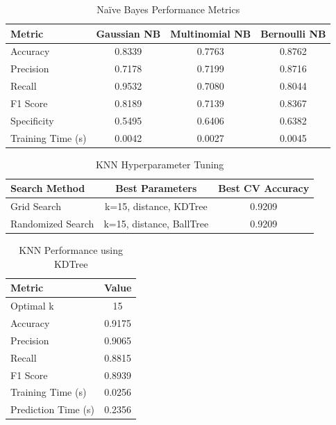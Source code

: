 \documentclass[11pt]{article}
\begin{document}
\begin{table}[H]
\centering
\caption{Naïve Bayes Performance Metrics}
\begin{tabular}{|l|c|c|c|}
\hline
\textbf{Metric} & \textbf{Gaussian NB} & \textbf{Multinomial NB} & \textbf{Bernoulli NB} \\ \hline
Accuracy & 0.8339 & 0.7763 & 0.8762 \\ \hline
Precision & 0.7178 & 0.7199 & 0.8716 \\ \hline
Recall & 0.9532 & 0.7080 & 0.8044 \\ \hline
F1 Score & 0.8189 & 0.7139 & 0.8367 \\ \hline
Specificity & 0.5495 & 0.6406 & 0.6382 \\ \hline
Training Time (s) & 0.0042 & 0.0027 & 0.0045 \\ \hline
\end{tabular}
\end{table}

\begin{table}[H]
\centering
\caption{KNN Hyperparameter Tuning}
\begin{tabular}{|l|c|c|}
\hline
\textbf{Search Method} & \textbf{Best Parameters} & \textbf{Best CV Accuracy} \\ \hline
Grid Search & k=15, distance, KDTree & 0.9209 \\ \hline
Randomized Search & k=15, distance, BallTree & 0.9209 \\ \hline
\end{tabular}
\end{table}

\begin{table}[H]
\centering
\caption{KNN Performance using KDTree}
\begin{tabular}{|l|c|}
\hline
\textbf{Metric} & \textbf{Value} \\ \hline
Optimal k & 15 \\ \hline
Accuracy & 0.9175 \\ \hline
Precision & 0.9065 \\ \hline
Recall & 0.8815 \\ \hline
F1 Score & 0.8939 \\ \hline
Training Time (s) & 0.0256 \\ \hline
Prediction Time (s) & 0.2356 \\ \hline
\end{tabular}
\end{table}
\end{document}
